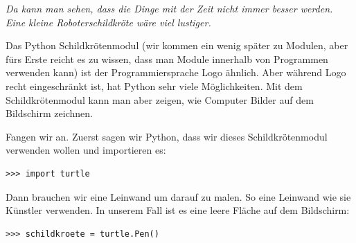 \emph{Da kann man sehen, dass die Dinge mit der Zeit nicht immer besser werden. Eine kleine Roboterschildkröte wäre viel lustiger.}

Das Python Schildkrötenmodul (wir kommen ein wenig später zu Modulen, aber fürs Erste reicht es zu wissen, dass man Module innerhalb von Programmen verwenden kann) ist der Programmiersprache Logo ähnlich. Aber während Logo recht eingeschränkt ist, hat Python sehr viele Möglichkeiten. Mit dem Schildkrötenmodul kann man aber zeigen, wie Computer Bilder auf dem Bildschirm zeichnen.

Fangen wir an. Zuerst sagen wir Python, dass wir dieses Schildkrötenmodul verwenden wollen und importieren es:


\begin{Verbatim}[frame=single]
>>> import turtle
\end{Verbatim}

Dann brauchen wir eine Leinwand um darauf zu malen. So eine Leinwand wie sie Künstler verwenden. In unserem Fall ist es eine leere Fläche auf dem Bildschirm:

\begin{Verbatim}[frame=single]
>>> schildkroete = turtle.Pen()
\end{Verbatim}

